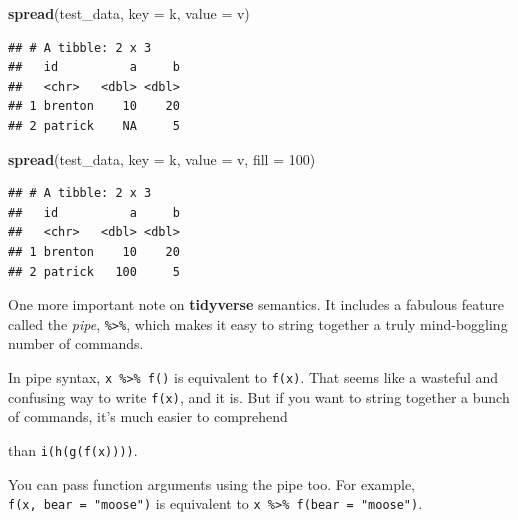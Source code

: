 \documentclass[12pt,oneside,openany]{book}
\newenvironment{Shaded}{\begin{snugshade}}{\end{snugshade}}
\newcommand{\KeywordTok}[1]{\textcolor[rgb]{0.13,0.29,0.53}{\textbf{#1}}}
\newcommand{\DataTypeTok}[1]{\textcolor[rgb]{0.13,0.29,0.53}{#1}}
\newcommand{\DecValTok}[1]{\textcolor[rgb]{0.00,0.00,0.81}{#1}}
\newcommand{\StringTok}[1]{\textcolor[rgb]{0.31,0.60,0.02}{#1}}
\newcommand{\OperatorTok}[1]{\textcolor[rgb]{0.81,0.36,0.00}{\textbf{#1}}}
\newcommand{\NormalTok}[1]{#1}
\begin{document}
\begin{Shaded}
\begin{Highlighting}[]
\KeywordTok{spread}\NormalTok{(test_data, }\DataTypeTok{key =}\NormalTok{ k, }\DataTypeTok{value =}\NormalTok{ v)}
\end{Highlighting}
\end{Shaded}

\begin{verbatim}
## # A tibble: 2 x 3
##   id          a     b
##   <chr>   <dbl> <dbl>
## 1 brenton    10    20
## 2 patrick    NA     5
\end{verbatim}

\begin{Shaded}
\begin{Highlighting}[]
\KeywordTok{spread}\NormalTok{(test_data, }\DataTypeTok{key =}\NormalTok{ k, }\DataTypeTok{value =}\NormalTok{ v, }\DataTypeTok{fill =} \DecValTok{100}\NormalTok{)}
\end{Highlighting}
\end{Shaded}

\begin{verbatim}
## # A tibble: 2 x 3
##   id          a     b
##   <chr>   <dbl> <dbl>
## 1 brenton    10    20
## 2 patrick   100     5
\end{verbatim}

One more important note on \textbf{tidyverse} semantics. It includes a
fabulous feature called the \emph{pipe}, \texttt{\%\textgreater{}\%},
which makes it easy to string together a truly mind-boggling number of
commands.

In pipe syntax, \texttt{x\ \%\textgreater{}\%\ f()} is equivalent to
\texttt{f(x)}. That seems like a wasteful and confusing way to write
\texttt{f(x)}, and it is. But if you want to string together a bunch of
commands, it's much easier to comprehend

\begin{Shaded}
\end{Shaded}

than \texttt{i(h(g(f(x))))}.

You can pass function arguments using the pipe too. For example,
\texttt{f(x,\ bear\ =\ "moose")} is equivalent to
\texttt{x\ \%\textgreater{}\%\ f(bear\ =\ "moose")}.
\end{document}
